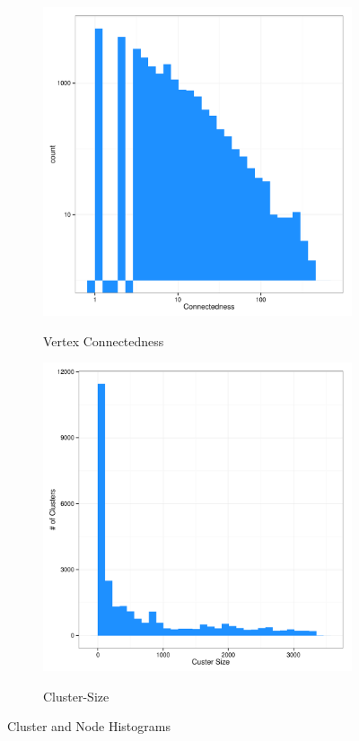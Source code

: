 \begin{figure}[!htb]
  \centering
  \begin{subfigure}[b]{0.49\textwidth}
    \caption{Vertex Connectedness}
    \includegraphics[width=\textwidth]{wiki_edge_hist.pdf}
    \label{fig:wiki_conn}
  \end{subfigure}
  \hfill
  \begin{subfigure}[b]{0.49\textwidth}
    \caption{Cluster-Size}
    \includegraphics[width=\textwidth]{wiki_cl_hist.pdf}
    \label{fig:wiki_size}
  \end{subfigure}
  \caption{Cluster and Node Histograms}
\end{figure}

